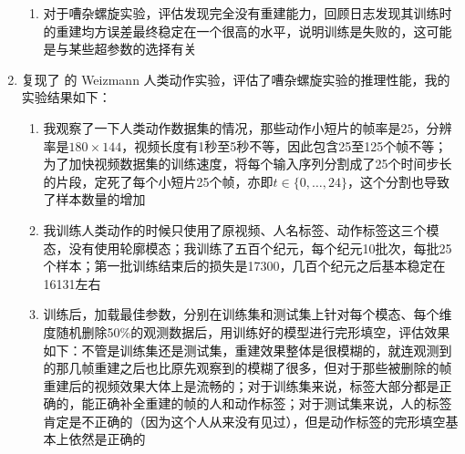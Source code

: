 \documentclass[11pt]{article}
\begin{document}
\begin{enumerate}
\begin{enumerate}
\item 对于嘈杂螺旋实验，评估发现完全没有重建能力，回顾日志发现其训练时的重建均方误差最终稳定在一个很高的水平，说明训练是失败的，这可能是与某些超参数的选择有关
\end{enumerate}
\item 复现了 \cite{Tan2019FactorizedII} 的 Weizmann 人类动作实验，评估了嘈杂螺旋实验的推理性能，我的实验结果如下：
\begin{enumerate}
\item 我观察了一下人类动作数据集的情况，那些动作小短片的帧率是$25$，分辨率是$180\times144$，视频长度有1秒至5秒不等，因此包含25至125个帧不等；\cite{Tan2019FactorizedII} 为了加快视频数据集的训练速度，将每个输入序列分割成了25个时间步长的片段，定死了每个小短片25个帧，亦即$t\in\{0,\dots,24\}$，这个分割也导致了样本数量的增加
\item 我训练人类动作的时候只使用了原视频、人名标签、动作标签这三个模态，没有使用轮廓模态；我训练了五百个纪元，每个纪元10批次，每批25个样本；第一批训练结束后的损失是17300，几百个纪元之后基本稳定在16131左右
\item 训练后，加载最佳参数，分别在训练集和测试集上针对每个模态、每个维度随机删除50\%的观测数据后，用训练好的模型进行完形填空，评估效果如下：不管是训练集还是测试集，重建效果整体是很模糊的，就连观测到的那几帧重建之后也比原先观察到的模糊了很多，但对于那些被删除的帧重建后的视频效果大体上是流畅的；对于训练集来说，标签大部分都是正确的，能正确补全重建的帧的人和动作标签；对于测试集来说，人的标签肯定是不正确的（因为这个人从来没有见过），但是动作标签的完形填空基本上依然是正确的
\end{enumerate}
\end{enumerate}

\renewcommand\refname{参考文献}


\end{document}
